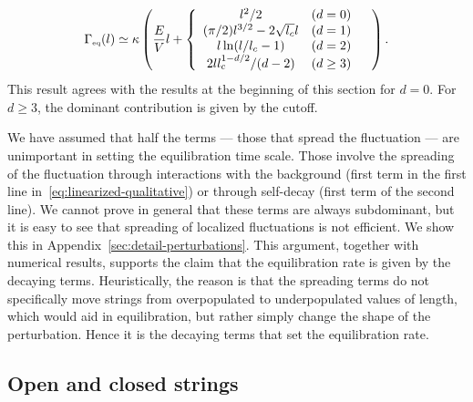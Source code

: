 \documentclass[a4paper,11pt]{article}
\newcommand{\lr}[1]{\left(#1\right)}
\begin{document}
\begin{equation}
\begin{split}
\Gamma_{\text{\tiny{eq}}}(l)&\simeq  \kappa\left(\frac EV l +\left\{
\begin{array}{cc} l^2/2 & (d=0)\\ (\pi/2)l^{3/2}-2\sqrt{l_c}l & (d=1)\\
l\ln(l/l_c-1) & (d=2)\\ 2ll_c^{1-d/2}/(d-2) & (d\geq 3)\end{array}\right. 
\quad\right) . \\
\end{split}
\end{equation}
This result agrees with the results at the beginning of this section for $d=0$.
For $d\geq 3$, the dominant contribution is given by the cutoff. 

We have assumed that half the terms --- those that spread the fluctuation ---
are unimportant in setting the equilibration time scale.
Those involve the spreading of the fluctuation through interactions with the background (first term in the first line in~\eqref{eq:linearized-qualitative}) or through self-decay (first term of the second line).
We cannot prove in general that these terms are always subdominant, but it is easy to see that spreading of localized fluctuations is not efficient. 
We show this in Appendix~\ref{sec:detail-perturbations}.
This argument, together with numerical results, supports the claim that the equilibration rate is given by the decaying terms. Heuristically, the reason is
that the spreading terms do not specifically move strings from overpopulated
to underpopulated values of length, which would aid in equilibration, but
rather simply change the shape of the perturbation. Hence it is the decaying
terms that set the equilibration rate.



\subsection{Open and closed strings}
\end{document}
